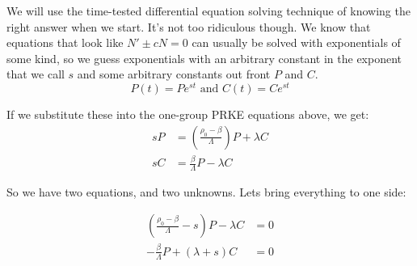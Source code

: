 \documentclass[letter]{article}
\begin{document}
We will use the time-tested differential equation solving technique of
knowing the right answer when we start. It's not too ridiculous
though. We know that equations that look like $N' \pm cN = 0$ can usually be solved with
exponentials of some kind, so we guess exponentials with an arbitrary
constant in the exponent that we call $s$ and some arbitrary constants
out front $P$ and $C$.
\begin{equation*}
  P(t) = Pe^{st} \text{ and } C(t) = Ce^{st}
\end{equation*}

If we substitute these into the one-group PRKE equations above, we get:
\begin{equation*}
  \begin{split}
    sP &= \left(\frac{\rho_0-\beta}{\Lambda}\right)P+\lambda{}C \\
    sC &= \frac{\beta}{\Lambda}P-\lambda{}C
  \end{split}
\end{equation*}

So we have two equations, and two unknowns. Lets bring everything to
one side:

\begin{equation*}
  \begin{split}
     \left(\frac{\rho_0-\beta}{\Lambda}-s\right)P-\lambda{}C &= 0\\
    -\frac{\beta}{\Lambda}P+(\lambda{}+s)C &= 0 
  \end{split}
\end{equation*}
\end{document}

